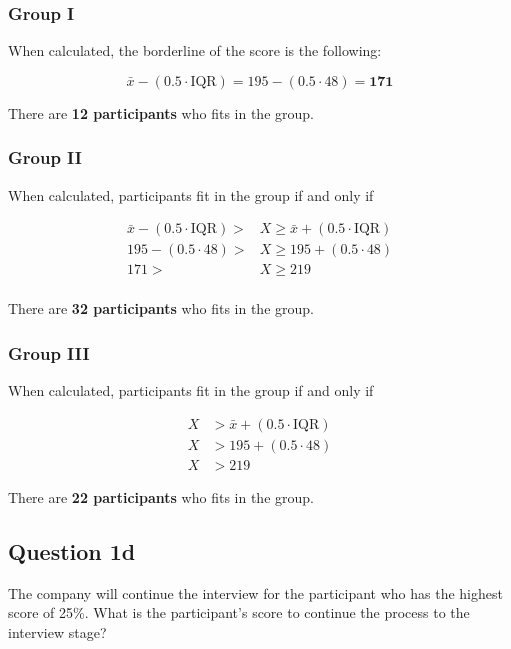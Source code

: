 \documentclass[
  11pt, %
]{assignment}
\begin{document}
\subsubsection*{Group I}

When calculated, the borderline of the score is the following:

\[ \bar{x} - (0.5 \cdot \text{IQR}) = 195 - (0.5 \cdot 48 ) = \textbf{171} \]

There are \textbf{12 participants} who fits in the group.

\subsubsection*{Group II}

When calculated, participants fit in the group if and only if

\begin{align*}
  \bar{x} - (0.5 \cdot \text{IQR}) > & X \ge \bar{x} + (0.5 \cdot \text{IQR}) \\
  195 - (0.5 \cdot 48 ) >            & X \ge 195 + (0.5 \cdot 48)             \\
  171 >                              & X \ge 219                              \\
\end{align*}

There are \textbf{32 participants} who fits in the group.

\subsubsection*{Group III}

When calculated, participants fit in the group if and only if

\begin{align*}
  X & > \bar{x} + (0.5 \cdot \text{IQR}) \\
  X & > 195 + (0.5 \cdot 48)             \\
  X & > 219
\end{align*}

There are \textbf{22 participants} who fits in the group.

\subsection*{Question 1d}
\begin{problem}
The company will continue the interview for the participant who has the highest score of 25\%. What is the participant's score to continue the process to the interview stage?
\end{problem}
\end{document}

